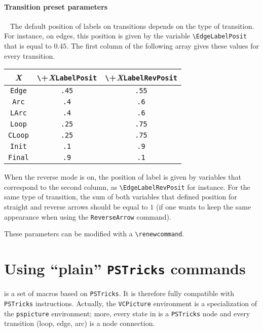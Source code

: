 \documentclass[11pt,twoside]{article}
\newcommand{\PSTricks}{\texttt{PSTricks}\xspace}
\begin{document}
{\paragraph{Transition preset parameters}
~
The default position of labels on transitions depends on the type of transition.
For instance, on edges, this position is given by the variable \verb+\EdgeLabelPosit+
that is equal to $0.45$. The first column of the following array gives these values
for every transition.

\begin{center}
\begin{tabular}{c|c|c|}
\textsl{X} & \verb+\+\textsl{X}\texttt{LabelPosit} & \verb+\+\textsl{X}\texttt{LabelRevPosit} \\
\hline
\texttt{Edge} & \texttt{.45} & \texttt{.55}\\
\hline
\texttt{Arc} & \texttt{.4} & \texttt{.6}\\
\hline
\texttt{LArc} & \texttt{.4} & \texttt{.6}\\
\hline
\texttt{Loop} & \texttt{.25} & \texttt{.75}\\
\hline
\texttt{CLoop} & \texttt{.25} & \texttt{.75}\\
\hline
\texttt{Init} & \texttt{.1} & \texttt{.9}\\
\hline
\texttt{Final} & \texttt{.9} & \texttt{.1}\\
\hline
\end{tabular}
\end{center}

When the reverse mode is on, the position of label is given by
variables that correspond to the second column, as \verb+\EdgeLabelRevPosit+ for instance.
For the same type of transition, the sum of both variables
that defined position for straight and reverse arrows should
be equal to $1$ (if one wants to keep the same appearance when using
the \verb+ReverseArrow+ command).

These parameters can be modified with a \verb+\renewcommand+.

\section{Using ``plain'' \PSTricks commands}
\label{sec.pla}
\VCSG is a set of macros based on \PSTricks. It is therefore
fully compatible with \PSTricks instructions.
Actually, the \verb+VCPicture+ environment is a specialization
of the \verb+pspicture+ environment; more, every state in \VCSG
is a \PSTricks node and every transition (loop, edge, arc)
is a node connection.

}
\end{document}
